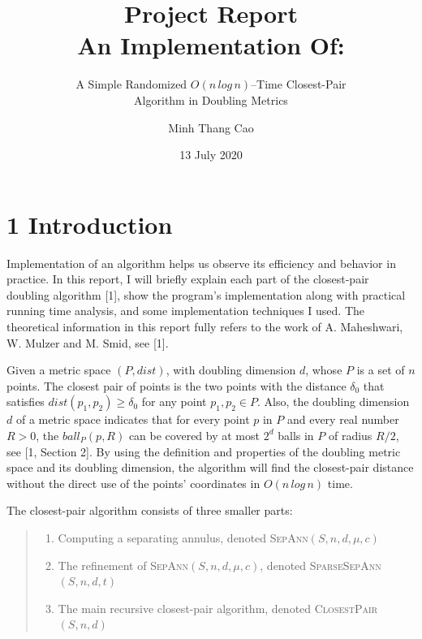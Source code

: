 \documentclass[12pt,english,]{article}
\title{\textbf{Project Report}\\
\Large{An Implementation Of:}}
\subtitle{A Simple Randomized \(O(n\,log\, n)\)--Time Closest-Pair\\
Algorithm in Doubling Metrics}
\author{Minh Thang Cao}
\date{13 July 2020}
\begin{document}
\maketitle

\hypertarget{introduction}{%
\section{\texorpdfstring{1
\enspace Introduction}{1 Introduction}}\label{introduction}}

Implementation of an algorithm helps us observe its efficiency and
behavior in practice. In this report, I will briefly explain each part
of the closest-pair doubling algorithm {[}1{]}, show the program's
implementation along with practical running time analysis, and some
implementation techniques I used. The theoretical information in this
report fully refers to the work of A. Maheshwari, W. Mulzer and M. Smid,
see {[}1{]}.

Given a metric space \((P,dist)\), with doubling dimension \(d\), whose
\(P\) is a set of \(n\) points. The closest pair of points is the two
points with the distance \(\delta_0\) that satisfies
\(dist(p_1, p_2) \geq \delta_0\) for any point \(p_1, p_2 \in P\). Also,
the doubling dimension \(d\) of a metric space indicates that for every
point \(p\) in \(P\) and every real number \(R > 0\), the
\(ball_P(p, R)\) can be covered by at most \(2^d\) balls in \(P\) of
radius \(R/2\), see {[}1, Section 2{]}. By using the definition and
properties of the doubling metric space and its doubling dimension, the
algorithm will find the closest-pair distance without the direct use of
the points' coordinates in \(O(n\,log\,n)\) time.

The closest-pair algorithm consists of three smaller parts:

\vspace{-2.5truemm}

\begin{quote}
\begin{enumerate}
\item Computing a separating annulus, denoted \textsc{SepAnn}$(S,n,d,\mu,c)$
\item The refinement of \textsc{SepAnn}$(S,n,d,\mu,c)$, denoted \textsc{SparseSepAnn}$(S,n,d,t)$
\item The main recursive closest-pair algorithm, denoted \textsc{ClosestPair}$(S,n,d)$
\end{enumerate}
\end{quote}
\end{document}
